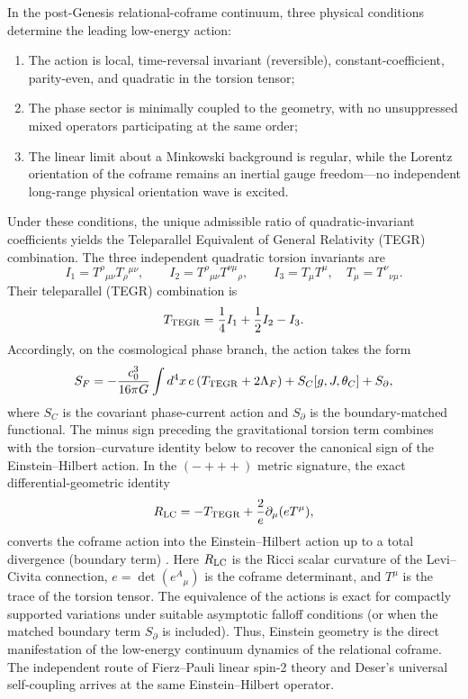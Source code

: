 \documentclass[11pt,a4paper]{article}
\begin{document}
In the post-Genesis relational-coframe continuum, three physical conditions determine the leading low-energy action:
\begin{enumerate}[label=\arabic*.]
\item The action is local, time-reversal invariant (reversible), constant-coefficient, parity-even, and quadratic in the torsion tensor;
\item The phase sector is minimally coupled to the geometry, with no unsuppressed mixed operators participating at the same order;
\item The linear limit about a Minkowski background is regular, while the Lorentz orientation of the coframe remains an inertial gauge freedom---no independent long-range physical orientation wave is excited.
\end{enumerate}
Under these conditions, the unique admissible ratio of quadratic-invariant coefficients yields the Teleparallel Equivalent of General Relativity (TEGR) combination. The three independent quadratic torsion invariants are
\begin{equation}
I_1=T^\rho{}_{\mu\nu}T_\rho{}^{\mu\nu},\qquad
I_2=T^\rho{}_{\mu\nu}T^{\nu\mu}{}_\rho,\qquad
I_3=T_\mu T^\mu,\quad T_\mu=T^\nu{}_{\nu\mu}.
\end{equation}
Their teleparallel (TEGR) combination is
\begin{equation}
T_{\rm TEGR}=\frac14 I_1+\frac12 I_2-I_3.
\end{equation}
Accordingly, on the cosmological phase branch, the action takes the form
\begin{equation}
S_F=-\frac{c_0^3}{16\pi G}\int d^4x\,e
\left(T_{\rm TEGR}+2\Lambda_F\right)
+S_C[g,J,\theta_C]+S_{\partial},
\end{equation}
where $S_C$ is the covariant phase-current action and $S_{\partial}$ is the boundary-matched functional. The minus sign preceding the gravitational torsion term combines with the torsion--curvature identity below to recover the canonical sign of the Einstein--Hilbert action.
In the $(-+++)$ metric signature, the exact differential-geometric identity
\begin{equation}
R_{\rm LC}=-T_{\rm TEGR}+\frac{2}{e}\partial_\mu(eT^\mu),
\end{equation}
converts the coframe action into the Einstein--Hilbert action up to a total divergence (boundary term) \citep{jimenez2020ngr,maluf2013tegr}. Here $R_{\rm LC}$ is the Ricci scalar curvature of the Levi--Civita connection, $e=\det(e^A{}_\mu)$ is the coframe determinant, and $T^\mu$ is the trace of the torsion tensor. The equivalence of the actions is exact for compactly supported variations under suitable asymptotic falloff conditions (or when the matched boundary term $S_\partial$ is included). Thus, Einstein geometry is the direct manifestation of the low-energy continuum dynamics of the relational coframe. The independent route of Fierz--Pauli linear spin-2 theory and Deser's universal self-coupling arrives at the same Einstein--Hilbert operator.
\end{document}

